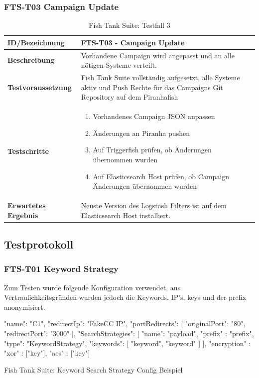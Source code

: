 \begin{table}[H]
	\subsubsection{FTS-T03 Campaign Update}
    \centering
	\begin{tabularx}{\textwidth}{| l | p{} |}
        \hline
        \textbf{ID/Bezeichnung} & FTS-T03 - Campaign Update\\ \hline
        \textbf{Beschreibung} &  Vorhandene Campaign wird angepasst und an alle nötigen Systeme verteilt.\\ \hline  
        \textbf{Testvoraussetzung} &  Fish Tank Suite vollständig aufgesetzt, alle Systeme aktiv und Push Rechte für das Campaigns Git Repository auf dem Piranhafish\\ \hline      
        \textbf{Testschritte} & \begin{enumerate}
        	\item Vorhandenes Campaign JSON anpassen
        	\item Änderungen an Piranha pushen
        	\item Auf Triggerfish prüfen, ob Änderungen übernommen wurden
        	\item Auf Elasticsearch Host prüfen, ob Campaign Änderungen übernommen wurden
        \end{enumerate} \\ \hline    
        \textbf{Erwartetes Ergebnis} & Neuste Version des Logstash Filters ist auf dem Elasticsearch Host installiert.\\ \hline      
    \end{tabularx}
    \caption{Fish Tank Suite: Testfall 3}
\end{table}

\subsection{Testprotokoll}
\subsubsection{FTS-T01 Keyword Strategy}
Zum Testen wurde folgende Konfiguration verwendet, aus Vertraulichkeitsgründen wurden jedoch die Keywords, IP's, keys und der prefix anonymisiert.
\begin{listing}[H]
\begin{jscode}
{
  "name": "C1",
  "redirectIp": "FakeCC IP",
  "portRedirects": [
    {
      "originalPort": "80",
      "redirectPort": "3000"
    }
  ],
  "SearchStrategies": [
    {
      "name": "payload",
      "prefix" : "prefix",
      "type": "KeywordStrategy",
      "keywords": [
        "keyword",
        "keyword"
      ]
    }
  ],
  "encryption" : {
   "xor" : ["key"],
   "aes" : ["key"]
  }
}
\end{jscode}
\caption{Fish Tank Suite: Keyword Search Strategy Config Beispiel}
\label{lst:keyword-strategry-config-example-protocol}
\end{listing}


